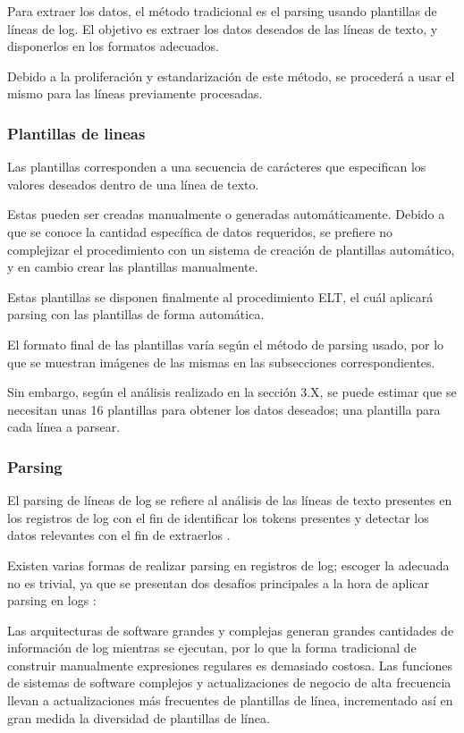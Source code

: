 Para extraer los datos, el método tradicional es el parsing usando plantillas de líneas de log. El objetivo es extraer los datos deseados de las líneas de texto, y disponerlos en los formatos adecuados.

Debido a la proliferación y estandarización de este método, se procederá a usar el mismo para las líneas previamente procesadas.

\subsubsection{Plantillas de lineas}

Las plantillas corresponden a una secuencia de carácteres que especifican los valores deseados dentro de una línea de texto.

Estas pueden ser creadas manualmente o generadas automáticamente. Debido a que se conoce la cantidad específica de datos requeridos, se prefiere no complejizar el procedimiento con un sistema de creación de plantillas automático, y en cambio crear las plantillas manualmente.

Estas plantillas se disponen finalmente al procedimiento ELT, el cuál aplicará parsing con las plantillas de forma automática.

El formato final de las plantillas varía según el método de parsing usado, por lo que se muestran imágenes de las mismas en las subsecciones correspondientes.

Sin embargo, según el análisis realizado en la sección 3.X, se puede estimar que se necesitan unas 16 plantillas para obtener los datos deseados; una plantilla para cada línea a parsear.

\subsubsection{Parsing}

El parsing de líneas de log se refiere al análisis de las líneas de texto presentes en los registros de log con el fin de identificar los tokens presentes y detectar los datos relevantes con el fin de extraerlos \cite{jayathilake2011mind}. 

Existen varias formas de realizar parsing en registros de log; escoger la adecuada no es trivial, ya que se presentan dos desafíos principales a la hora de aplicar parsing en logs \cite{jayathilake2011mind}:

Las arquitecturas de software grandes y complejas generan grandes cantidades de información de log mientras se ejecutan, por lo que la forma tradicional de construir manualmente expresiones regulares es demasiado costosa.
Las funciones de sistemas de software complejos y actualizaciones de negocio de alta frecuencia llevan a actualizaciones más frecuentes de plantillas de línea, incrementado así en gran medida la diversidad de plantillas de línea.

